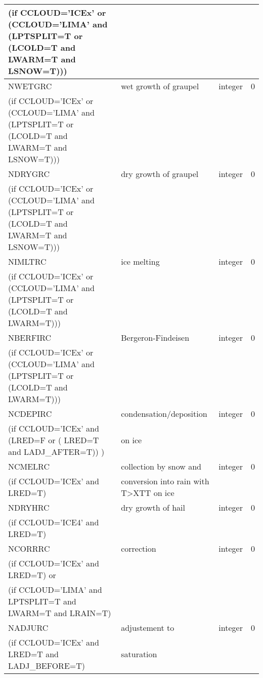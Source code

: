 \begin{longtable} {|p{}|p{}|>{\centering}p{}|p{}<{\centering}|}
(if CCLOUD='ICEx' or (CCLOUD='LIMA' and (LPTSPLIT=T or (LCOLD=T and LWARM=T and LSNOW=T))) & & & \\\hline
NWETGRC   & wet growth of graupel  & integer  &  0 \index{NWETGRC!\innam{NAM\_BU\_RRC}}\\ \nopagebreak
(if CCLOUD='ICEx' or (CCLOUD='LIMA' and (LPTSPLIT=T or (LCOLD=T and LWARM=T and LSNOW=T))) & & & \\\hline
NDRYGRC   & dry growth of graupel & integer  &  0 \index{NDRYGRC!\innam{NAM\_BU\_RRC}}\\ \nopagebreak
(if CCLOUD='ICEx' or (CCLOUD='LIMA' and (LPTSPLIT=T or (LCOLD=T and LWARM=T and LSNOW=T))) & & & \\\hline
NIMLTRC   & ice melting & integer  &  0 \index{NIMLTRC!\innam{NAM\_BU\_RRC}}\\ \nopagebreak
(if CCLOUD='ICEx' or (CCLOUD='LIMA' and (LPTSPLIT=T or (LCOLD=T and LWARM=T))) & &   &  \\\hline
NBERFIRC  & Bergeron-Findeisen & integer  &  0 \index{NBERFIRC!\innam{NAM\_BU\_RRC}}\\ \nopagebreak
(if CCLOUD='ICEx' or (CCLOUD='LIMA' and (LPTSPLIT=T or (LCOLD=T and LWARM=T))) & &   &  \\\hline
NCDEPIRC  & condensation/deposition & integer  &  0 \index{NDEPIRC!\innam{NAM\_BU\_RRC}}\\ \nopagebreak
(if CCLOUD='ICEx' and (LRED=F or ( LRED=T and LADJ\_AFTER=T))  ) &on ice &   &  \\\hline
NCMELRC  & collection by snow and  & integer  &  0 \index{NCMELRC!\innam{NAM\_BU\_RRC}}\\ \nopagebreak
(if CCLOUD='ICEx' and LRED=T) & conversion into rain with T>XTT on ice &   &  \\\hline
NDRYHRC  & dry growth of hail & integer  &  0 \index{NDRYHRC!\innam{NAM\_BU\_RRC}}\\ \nopagebreak
(if CCLOUD='ICE4' and LRED=T) & &   &  \\\hline
NCORRRC  & correction & integer  &  0 \index{NCORRRC!\innam{NAM\_BU\_RRC}}\\ \nopagebreak
(if CCLOUD='ICEx' and LRED=T) or & &   &  \\ \nopagebreak
(if CCLOUD='LIMA' and LPTSPLIT=T and LWARM=T and LRAIN=T) & &   &  \\\hline
NADJURC  & adjustement to & integer  &  0 \index{NADJURC!\innam{NAM\_BU\_RRC}}\\ \nopagebreak
(if CCLOUD='ICEx' and LRED=T and LADJ\_BEFORE=T) &saturation &   &  \\\hline

\end{longtable}

